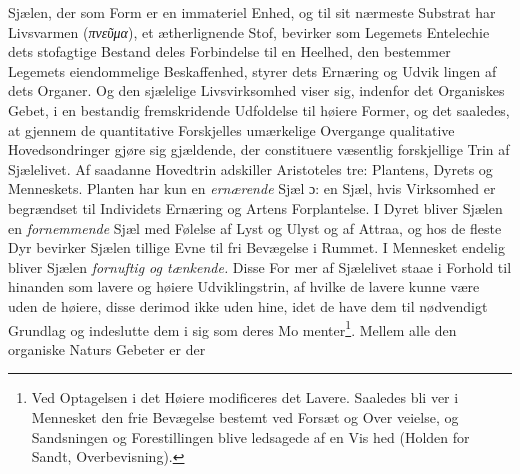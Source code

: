 \documentclass[12pt,a4paper]{book}
\newcommand{\gk}[1]{\textit{#1}}
\begin{document}
Sjælen, der som Form er en immateriel Enhed, og til sit
nærmeste Substrat har Livsvarmen (\gk{πνεῦμα}), et ætherlignende
Stof, bevirker som Legemets Entelechie dets stofagtige Bestand\-%
deles Forbindelse til en Heelhed, den bestemmer Legemets
\setcounter{footnote}{0}
eiendommelige Beskaffenhed, styrer dets Ernæring og Udvik\-%
lingen af dets Organer. Og den sjælelige Livsvirksomhed viser
sig, indenfor det Organiskes Gebet, i en bestandig fremskridende
Udfoldelse til høiere Former, og det saaledes, at gjennem de
quantitative Forskjelles umærkelige Overgange qualitative
Hovedsondringer gjøre sig gjældende, der constituere væsentlig
forskjellige Trin af Sjælelivet. Af saadanne Hovedtrin adskiller
Aristoteles tre: Plantens, Dyrets og Menneskets. Planten har
kun en \emph{ernærende} Sjæl ɔ: en Sjæl, hvis Virksomhed er
begrændset til Individets Ernæring og Artens Forplantelse. I
Dyret bliver Sjælen en \emph{fornemmende} Sjæl med Følelse af
Lyst og Ulyst og af Attraa, og hos de fleste Dyr bevirker
Sjælen tillige Evne til fri Bevægelse i Rummet. I Mennesket
endelig bliver Sjælen \emph{fornuftig og tænkende.} Disse For\-%
mer af Sjælelivet staae i Forhold til hinanden som lavere og
høiere Udviklingstrin, af hvilke de lavere kunne være uden de
høiere, disse derimod ikke uden hine, idet de have dem til
nødvendigt Grundlag og indeslutte dem i sig som deres Mo\-%
menter\footnote{Ved Optagelsen i det Høiere modificeres det Lavere. Saaledes bli\-%
ver i Mennesket den frie Bevægelse bestemt ved Forsæt og Over\-%
veielse, og Sandsningen og Forestillingen blive ledsagede af en Vis\-%
hed (Holden for Sandt, Overbevisning).}. Mellem alle den organiske Naturs Gebeter er der
\end{document}
